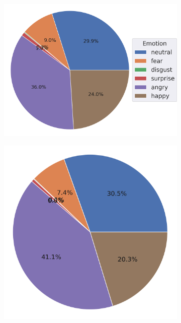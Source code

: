 \begin{figure}  [ht!]
\begin{subfigure}{0.25\textwidth}
    \includegraphics[width=\linewidth]{figs/plots/data-0-0_emotion_Emotion.png}
  \end{subfigure}\hfill
  \begin{subfigure}{0.235\textwidth}
  \centering
    \includegraphics[width=0.8\linewidth]{figs/plots/standard_sampler-1000-1000_emotion_Emotion.png}
  \end{subfigure}\hfill
  \begin{subfigure}{0.235\textwidth}
  \centering

\end{subfigure}
\end{figure}
